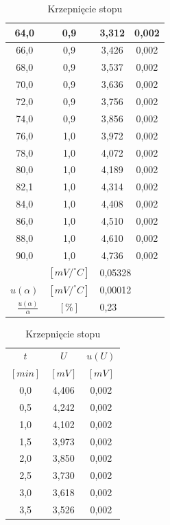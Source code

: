 \documentclass[polish, 11pt, a4paper]{article}
\begin{document}
\begin{table}[H]
\begin{minipage}{.5\textwidth}
\begin{tabular}{|c|c|c|c|}
					64,0	&	0,9	&	3,312	&	0,002	\\\hline
					66,0	&	0,9	&	3,426	&	0,002	\\\hline
					68,0	&	0,9	&	3,537	&	0,002	\\\hline
					70,0	&	0,9	&	3,636	&	0,002	\\\hline
					72,0	&	0,9	&	3,756	&	0,002	\\\hline
					74,0	&	0,9	&	3,856	&	0,002	\\\hline
					76,0	&	1,0	&	3,972	&	0,002	\\\hline
					78,0	&	1,0	&	4,072	&	0,002	\\\hline
					80,0	&	1,0	&	4,189	&	0,002	\\\hline
					82,1	&	1,0	&	4,314	&	0,002	\\\hline
					84,0	&	1,0	&	4,408	&	0,002	\\\hline
					86,0	&	1,0	&	4,510	&	0,002	\\\hline
					88,0	&	1,0	&	4,610	&	0,002	\\\hline
					90,0	&	1,0	&	4,736	&	0,002	\\\Xhline{3\arrayrulewidth}
					\multicolumn{1}{|r}{\(\alpha\)}	&	\([mV/^\circ C]\)	&	\multicolumn{2}{l|}{0,05328}	\\\hline
					\multicolumn{1}{|r}{\(u(\alpha)\)}	&	\([mV/^\circ C]\)	&	\multicolumn{2}{l|}{0,00012}	\\\hline
					\multicolumn{1}{|r}{\(\frac{u(\alpha)}{\alpha}\)}	&	\([\%]\)	&	\multicolumn{2}{l|}{0,23}	\\\hline
				\end{tabular}
			\end{minipage}%
			\begin{minipage}{.5\textwidth}
				\caption{Krzepnięcie stopu}
				\centering
				\begin{tabular}{|c|c|c|}\hline
					\(t\)	&	\(U\) 	&	\(u(U)\) 	\\
					\([min]\)	&	\([mV]\)	&	\([mV]\)	\\\hline
					0,0	&	4,406	&	0,002	\\\hline
					0,5	&	4,242	&	0,002	\\\hline
					1,0	&	4,102	&	0,002	\\\hline
					1,5	&	3,973	&	0,002	\\\hline
					2,0	&	3,850	&	0,002	\\\hline
					2,5	&	3,730	&	0,002	\\\hline
					3,0	&	3,618	&	0,002	\\\hline
					3,5	&	3,526	&	0,002	\\\hline

\end{tabular}
\end{minipage}
\end{table}
\end{document}
